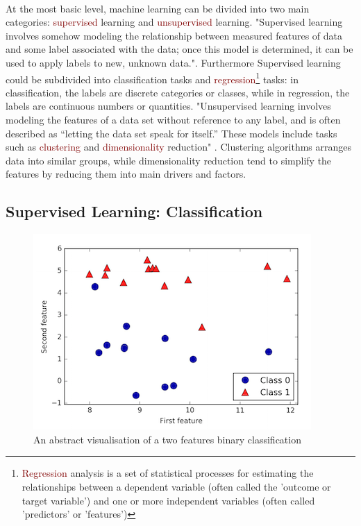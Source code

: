 \documentclass{tufte-handout}
\newcommand{\hlred}[1]{\textcolor{Maroon}{#1}}%
\begin{document}
\\At the most basic level, machine learning can be divided into two main categories: \hlred{supervised} learning and \hlred{unsupervised} learning.
"Supervised learning involves somehow modeling the relationship between measured features of data and some label associated with the data; once this model is determined, it can be used to apply labels to new, unknown data."\cite{Vanderplas2017}. Furthermore Supervised learning could be subdivided into classification tasks and \hlred{regression}\footnote{\hlred{Regression} analysis is a set of statistical processes for estimating the relationships between a dependent variable (often called the 'outcome or target variable') and one or more independent variables (often called 'predictors' or 'features')} tasks: in classification, the labels are discrete categories or classes, while in regression, the labels are continuous numbers or quantities. 
"Unsupervised learning involves modeling the features of a data set without reference to any label, and is often described as “letting the data set speak for itself.” These models include tasks such as \hlred{clustering} and \hlred{dimensionality} reduction" \cite{Vanderplas2017}. Clustering algorithms arranges data into similar groups, while dimensionality reduction tend to simplify the features by reducing them into main drivers and factors. 

\subsection{Supervised Learning: Classification}
\begin{figure}[h]%
  \includegraphics[width=\linewidth]{Classification.png}
  \caption{An abstract visualisation of a two features binary classification}
  \label{fig:Class}
\end{figure}
\end{document}
